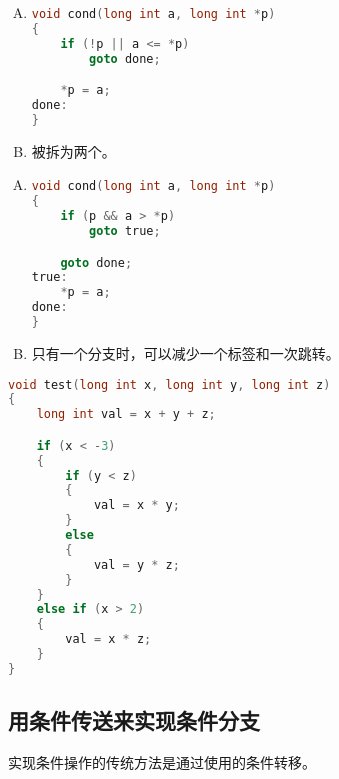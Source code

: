 {{        %
        \begin{practicec}
            \begin{enumerate}[A.]
                \item
                {
                    \begin{lstlisting}[language=C]
void cond(long int a, long int *p)
{
    if (!p || a <= *p)
        goto done;

    *p = a;
done:
}
                    \end{lstlisting}
                }
                \item
                {
                    \emcode{\&\&}被拆为两个。
                }
            \end{enumerate}
        \end{practicec}

        \begin{practicec}
            \begin{enumerate}[A.]
                \item
                {
                    \begin{lstlisting}[language=C]
void cond(long int a, long int *p)
{
    if (p && a > *p)
        goto true;

    goto done;
true:
    *p = a;
done:
}
                    \end{lstlisting}
                }
                \item
                {
                    只有一个分支时，可以减少一个标签和一次跳转。
                }
            \end{enumerate}
        \end{practicec}

        \begin{practicec}
            \begin{lstlisting}[language=C]
void test(long int x, long int y, long int z)
{
    long int val = x + y + z;

    if (x < -3)
    {
        if (y < z)
        {
            val = x * y;
        }
        else
        {
            val = y * z;
        }
    }
    else if (x > 2)
    {
        val = x * z;
    }
}
            \end{lstlisting}
        \end{practicec}
    }

    \subsection{用条件传送来实现条件分支}
    {
        实现条件操作的传统方法是通过使用的条件转移。

}}

